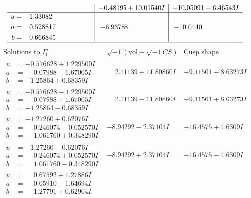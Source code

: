 \documentclass[1p]{elsarticle_modified}
\theoremstyle{definition}
\newcommand{\I}{\sqrt{-1}}
\begin{document}
$$\begin{array}{c|c|c}
 & -0.48195 + 10.01540 I & -10.05091 - 6.46543 I \\ \hline\begin{aligned}
u &= -1.33082\phantom{ +0.000000I} \\
a &= \phantom{-}0.528817\phantom{ +0.000000I} \\
b &= \phantom{-}0.666845\phantom{ +0.000000I}\end{aligned}
 & -6.93788\phantom{ +0.000000I} & -10.0440\phantom{ +0.000000I}\\
 \hline 
 \end{array}$$\newpage$$\begin{array}{c|c|c}  
\text{Solutions to }I^u_{1}& \I (\text{vol} + \sqrt{-1}CS) & \text{Cusp shape}\\
 \hline 
\begin{aligned}
u &= -0.576628 + 1.229500 I \\
a &= \phantom{-}0.07988 - 1.67005 I \\
b &= -1.25864 + 0.68359 I\end{aligned}
 & \phantom{-}2.41139 + 11.80860 I & -9.11501 - 8.63273 I \\ \hline\begin{aligned}
u &= -0.576628 - 1.229500 I \\
a &= \phantom{-}0.07988 + 1.67005 I \\
b &= -1.25864 - 0.68359 I\end{aligned}
 & \phantom{-}2.41139 - 11.80860 I & -9.11501 + 8.63273 I \\ \hline\begin{aligned}
u &= -1.27260 + 0.62076 I \\
a &= \phantom{-}0.246074 - 0.052570 I \\
b &= \phantom{-}1.061760 + 0.348290 I\end{aligned}
 & -8.94292 - 2.37104 I & -16.4575 + 4.6309 I \\ \hline\begin{aligned}
u &= -1.27260 - 0.62076 I \\
a &= \phantom{-}0.246074 + 0.052570 I \\
b &= \phantom{-}1.061760 - 0.348290 I\end{aligned}
 & -8.94292 + 2.37104 I & -16.4575 - 4.6309 I \\ \hline\begin{aligned}
u &= \phantom{-}0.67592 + 1.27886 I \\
a &= \phantom{-}0.05910 - 1.64694 I \\
b &= \phantom{-}1.27791 + 0.62904 I\end{aligned}

\end{array}$$
\end{document}
